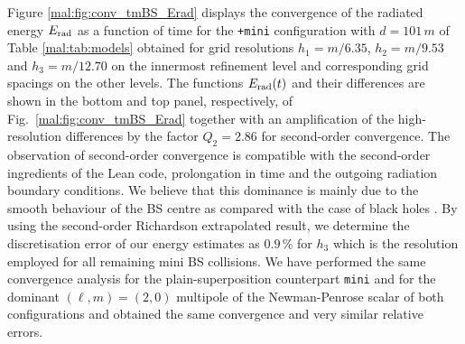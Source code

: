 Figure \ref{mal:fig:conv_tmBS_Erad} displays the convergence
of the radiated energy $E_{\rm rad}$ as a function
of time for the {\tt +mini} configuration with $d=101\,m$ of
Table \ref{mal:tab:models} obtained for grid resolutions
$h_1=m/6.35$, $h_2=m/9.53$ and $h_3=m/12.70$ on the
innermost refinement level and corresponding grid 
spacings on the other levels. The functions
$E_{\rm rad}(t)$ and their differences are shown in the
bottom and top panel, respectively, of Fig.~\ref{mal:fig:conv_tmBS_Erad}
together with an amplification of the high-resolution
differences by the factor $Q_2=2.86$ for second-order
convergence. The observation of second-order convergence
is compatible with the second-order ingredients of the
{\sc Lean} code, prolongation in time and the outgoing
radiation boundary conditions. We believe that this
dominance is mainly due to the smooth behaviour
of the BS centre as compared with the case of black holes
\cite{Husa:2007hp}. By using the second-order
Richardson extrapolated result, we determine the
discretisation error of our energy estimates as
$0.9\,\%$ for $h_3$ which is the resolution employed
for all remaining mini BS collisions. We have performed
the same convergence analysis for the plain-superposition
counterpart {\tt mini} and for the dominant $(\ell,m)=(2,0)$
multipole of the Newman-Penrose scalar of both configurations
and obtained the same convergence and very similar relative
errors.
%
%

